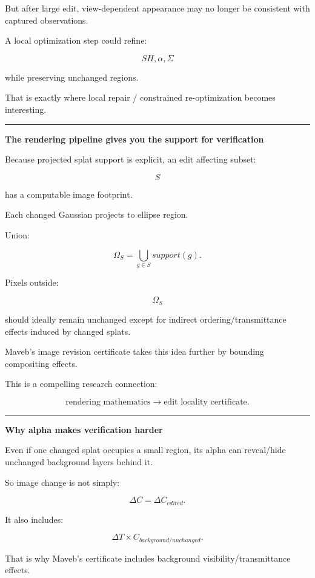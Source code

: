 But after large edit, view-dependent appearance may no longer be consistent with captured observations.

A local optimization step could refine:

\[
SH,
\alpha,
\Sigma
\]

while preserving unchanged regions.

That is exactly where local repair / constrained re-optimization becomes interesting.

\begin{center}\rule{0.5\linewidth}{0.5pt}\end{center}

\textbf{The rendering pipeline gives you the support for verification}

Because projected splat support is explicit, an edit affecting subset:

\[
S
\]

has a computable image footprint.

Each changed Gaussian projects to ellipse region.

Union:

\[
\Omega_S
=
\bigcup_{g\in S}
support(g).
\]

Pixels outside:

\[
\Omega_S
\]

should ideally remain unchanged except for indirect ordering/transmittance effects induced by changed splats.

Maveb's image revision certificate takes this idea further by bounding compositing effects.

This is a compelling research connection:

\[
\boxed{
\text{rendering mathematics}
\rightarrow
\text{edit locality certificate}.
}
\]

\begin{center}\rule{0.5\linewidth}{0.5pt}\end{center}

\textbf{Why alpha makes verification harder}

Even if one changed splat occupies a small region, its alpha can reveal/hide unchanged background layers behind it.

So image change is not simply:

\[
\Delta C=
\Delta C_{edited}.
\]

It also includes:

\[
\Delta T
\times
C_{background/unchanged}.
\]

That is why Maveb's certificate includes background visibility/transmittance effects.

